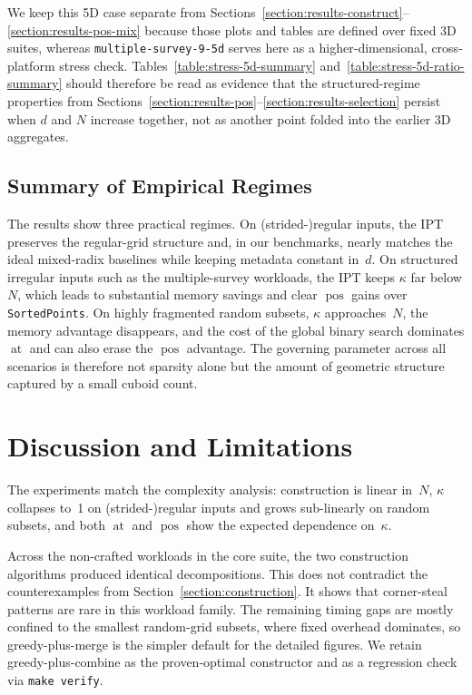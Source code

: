 \documentclass[manuscript,screen,review]{acmart}
\theoremstyle{definition}
\theoremstyle{plain}
\begin{document}
We keep this 5D case separate from
Sections~\ref{section:results-construct}--\ref{section:results-pos-mix}
because those plots and tables are defined over fixed 3D suites,
whereas \texttt{multiple-survey-9-5d} serves here as a higher-dimensional,
cross-platform stress check. Tables~\ref{table:stress-5d-summary}
and~\ref{table:stress-5d-ratio-summary} should therefore be read as
evidence that the structured-regime properties from
Sections~\ref{section:results-pos}--\ref{section:results-selection}
persist when $d$ and $N$ increase together, not as another point folded
into the earlier 3D aggregates.

\subsection{Summary of Empirical Regimes}
\label{section:results-summary}

The results show three practical regimes. On (strided-)regular inputs,
the IPT preserves the regular-grid structure and, in our benchmarks,
nearly matches the ideal mixed-radix baselines while keeping metadata
constant in~$d$.
On structured irregular inputs such as the multiple-survey workloads,
the IPT keeps $\kappa$ far below $N$, which leads to substantial memory
savings and clear $\operatorname{pos}$ gains over \texttt{SortedPoints}.
On highly fragmented random subsets, $\kappa$ approaches~$N$, the memory
advantage disappears, and the cost of the global binary search dominates
$\operatorname{at}$ and can also erase the $\operatorname{pos}$ advantage. The governing
parameter across all scenarios is therefore not sparsity alone but the
amount of geometric structure captured by a small cuboid count.

\section{Discussion and Limitations}
\label{section:discussion}

The experiments match the complexity analysis: construction is linear
in~$N$, $\kappa$ collapses to~1 on (strided-)regular inputs and grows
sub-linearly on random subsets, and both $\operatorname{at}$ and $\operatorname{pos}$
show the expected dependence on~$\kappa$.

Across the non-crafted workloads in the core suite, the two
construction algorithms produced identical decompositions. This does
not contradict the counterexamples from
Section~\ref{section:construction}. It shows that corner-steal
patterns are rare in this workload family. The remaining timing gaps
are mostly confined to the smallest random-grid subsets, where fixed
overhead dominates, so greedy-plus-merge is the simpler default for
the detailed figures. We retain greedy-plus-combine as the
proven-optimal constructor and as a regression check via
\texttt{make verify}.
\end{document}

